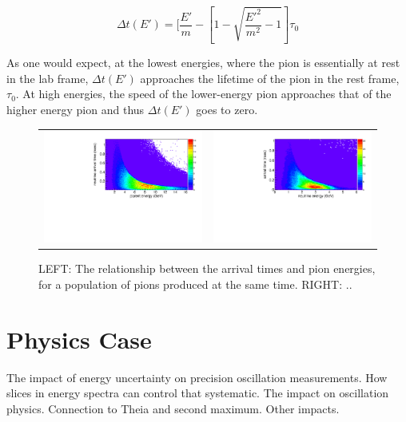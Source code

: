 \documentclass[preprint,12pt]{elsarticle}
\begin{document}
\begin{equation}
\Delta t(E') = [\frac{E'}{m} - [1 - \sqrt{ \frac{E'^2}{m^2} - 1}] \tau_0
\end{equation}

As one would expect, at the lowest energies, where the pion is essentially at rest in the lab frame, $\Delta t(E')$ approaches the lifetime of the pion in the rest frame, $\tau_0$. At high energies, the speed of the lower-energy pion approaches that of the higher energy pion and thus $\Delta t(E')$ goes to zero. 

\begin{figure}[t]
	\begin{center}
           	\begin{tabular}{c c}	
           	\includegraphics[width=0.49 \linewidth]{Figures/2018.10.14_LBNFtiming/parentEvsdT.pdf} &
			\includegraphics[width=0.49 \linewidth]{Figures/2018.10.14_LBNFtiming/nuEvsdT.pdf} \\
			\end{tabular}
	\end{center}
	\caption{LEFT: The relationship between the arrival times and pion energies, for a population of pions produced at the same time. RIGHT: ..}
		\label{fig:anniedetector}
\end{figure}


\section{Physics Case}

The impact of energy uncertainty on precision oscillation measurements. How slices in energy spectra can control that systematic. The impact on oscillation physics. Connection to Theia and second maximum. Other impacts.
\end{document}
